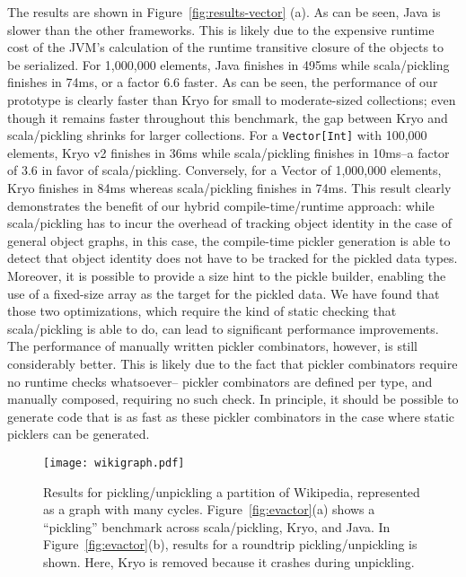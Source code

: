The results are shown in Figure~\ref{fig:results-vector} (a). As can be seen,
Java is slower than the other frameworks. This is likely due to the expensive
runtime cost of the JVM's calculation of the runtime transitive closure of the
objects to be serialized. For 1,000,000 elements, Java finishes in 495ms while
scala/pickling finishes in 74ms, or a factor 6.6 faster. As can be seen, the
performance of our prototype is clearly faster than Kryo for small to
moderate-sized collections; even though it remains faster throughout this
benchmark, the gap between Kryo and scala/pickling shrinks for larger
collections. For a \verb|Vector[Int]| with 100,000 elements, Kryo v2 finishes in 36ms
while scala/pickling finishes in 10ms--a factor of 3.6 in favor of
scala/pickling. Conversely, for a Vector of 1,000,000 elements, Kryo finishes
in 84ms whereas scala/pickling finishes in 74ms. This result clearly demonstrates the
benefit of our hybrid compile-time/runtime approach: while scala/pickling has
to incur the overhead of tracking object identity in the case of general
object graphs, in this case, the compile-time pickler generation is able to
detect that object identity does not have to be tracked for the pickled data types.
Moreover, it is possible to provide a size hint to the pickle builder,
enabling the use of a fixed-size array as the target for the pickled data. We
have found that those two optimizations, which require the kind of static
checking that scala/pickling is able to do, can lead to significant
performance improvements. The performance of manually written pickler
combinators, however, is still considerably better. This is likely due to the
fact that pickler combinators require no runtime checks whatsoever-- pickler
combinators are defined per type, and manually composed, requiring no such
check. In principle, it should be possible to generate code that is as fast as
these pickler combinators in the case where static picklers can be generated.


\begin{figure*}[ht!]
 \centering
 \texttt{[image: wikigraph.pdf]}
 \caption{Results for pickling/unpickling a partition of Wikipedia, represented as a graph with many cycles. Figure~\ref{fig:evactor}(a) shows a ``pickling'' benchmark across scala/pickling, Kryo, and Java. In Figure~\ref{fig:evactor}(b), results for a roundtrip pickling/unpickling is shown. Here, Kryo is removed because it crashes during unpickling.}
 \label{fig:wikigraph}
\end{figure*}

